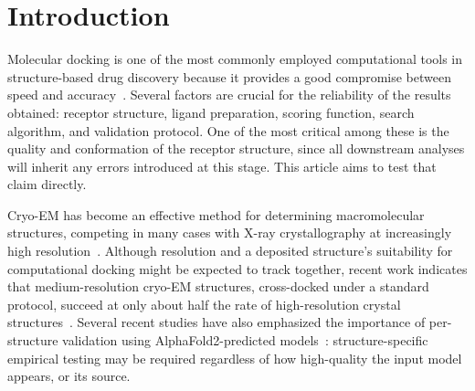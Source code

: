 \documentclass[global,twocolumn]{svjour}
\begin{document}

\section{Introduction}

Molecular docking is one of the most commonly employed computational tools
in structure-based drug discovery because it provides a good compromise
between speed and accuracy~\cite{trott2010,hartshorn2007}. Several factors
are crucial for the reliability of the results obtained: receptor
structure, ligand preparation, scoring function, search algorithm, and
validation protocol. One of the most critical among these is the quality
and conformation of the receptor structure, since all downstream analyses
will inherit any errors introduced at this stage. This article aims to
test that claim directly.

Cryo-EM has become an effective method for determining macromolecular
structures, competing in many cases with X-ray crystallography at
increasingly high resolution~\cite{pintilie2020,kuhlbrandt2014}. Although
resolution and a deposited structure's suitability for computational
docking might be expected to track together, recent work indicates that
medium-resolution cryo-EM structures, cross-docked under a standard
protocol, succeed at only about half the rate of high-resolution crystal
structures~\cite{lee2023}. Several recent studies have also emphasized the
importance of per-structure validation using AlphaFold2-predicted
models~\cite{holcomb2023,scardino2022}: structure-specific empirical
testing may be required regardless of how high-quality the input model
appears, or its source.
\end{document}
